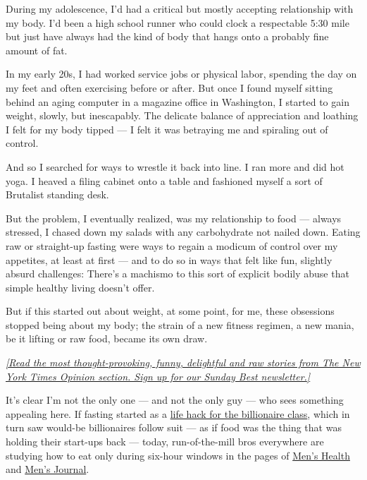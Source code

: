 During my adolescence, I'd had a critical but mostly accepting
relationship with my body. I'd been a high school runner who could clock
a respectable 5:30 mile but just have always had the kind of body that
hangs onto a probably fine amount of fat.

In my early 20s, I had worked service jobs or physical labor, spending
the day on my feet and often exercising before or after. But once I
found myself sitting behind an aging computer in a magazine office in
Washington, I started to gain weight, slowly, but inescapably. The
delicate balance of appreciation and loathing I felt for my body tipped
--- I felt it was betraying me and spiraling out of control.

And so I searched for ways to wrestle it back into line. I ran more and
did hot yoga. I heaved a filing cabinet onto a table and fashioned
myself a sort of Brutalist standing desk.

But the problem, I eventually realized, was my relationship to food ---
always stressed, I chased down my salads with any carbohydrate not
nailed down. Eating raw or straight-up fasting were ways to regain a
modicum of control over my appetites, at least at first --- and to do so
in ways that felt like fun, slightly absurd challenges: There's a
machismo to this sort of explicit bodily abuse that simple healthy
living doesn't offer.

But if this started out about weight, at some point, for me, these
obsessions stopped being about my body; the strain of a new fitness
regimen, a new mania, be it lifting or raw food, became its own draw.

\href{https://www.nytimes.com/newsletters/sunday-best?action=click\&module=Intentional\&pgtype=Article}{\emph{{[}Read
the most thought-provoking, funny, delightful and raw stories from The
New York Times Opinion section. Sign up for our Sunday Best
newsletter.{]}}}

It's clear I'm not the only one --- and not the only guy --- who sees
something appealing here. If fasting started as a
\href{https://amp.theguardian.com/lifeandstyle/2019/feb/21/extreme-fasting-how-silicon-valley-is-rebranding-eating-disorders?CMP=soc_568\&__twitter_impression=true}{life
hack for the billionaire class}, which in turn saw would-be billionaires
follow suit --- as if food was the thing that was holding their
start-ups back --- today, run-of-the-mill bros everywhere are studying
how to eat only during six-hour windows in the pages of
\href{https://www.menshealth.com/nutrition/a27632073/intermittent-fasting-diet-weight-loss/}{Men's
Health} and
\href{https://www.mensjournal.com/health-fitness/3-types-intermittent-fasting-compared/}{Men's
Journal}.

